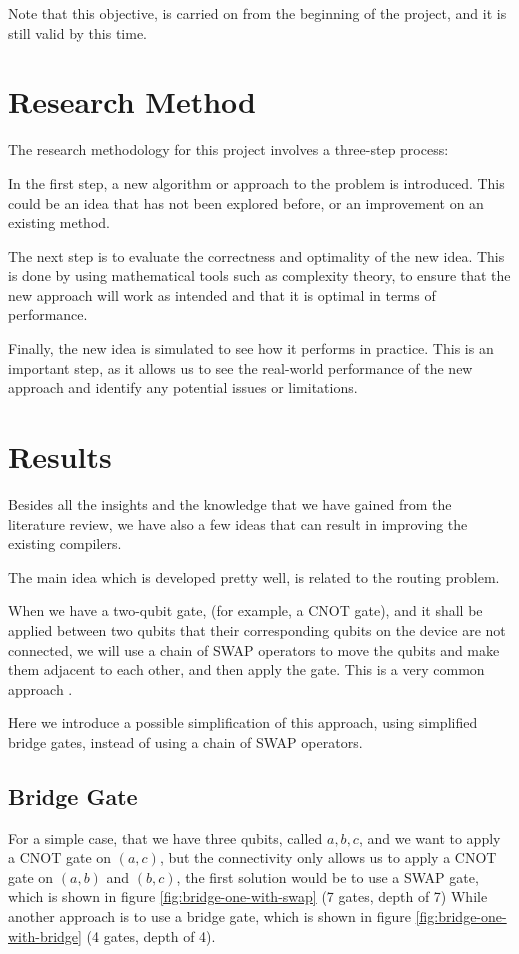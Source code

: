 \documentclass{article}
\begin{document}
Note that this objective, is carried on from the beginning of the project, and it is still valid by this time.

\section{Research Method}
The research methodology for this project involves a three-step process: 

In the first step, a new algorithm or approach to the problem is introduced. This could be an idea that has not been explored before, or an improvement on an existing method.

The next step is to evaluate the correctness and optimality of the new idea. This is done by using mathematical tools such as complexity theory, to ensure that the new approach will work as intended and that it is optimal in terms of performance.

Finally, the new idea is simulated to see how it performs in practice. This is an important step, as it allows us to see the real-world performance of the new approach and identify any potential issues or limitations.

\section{Results}

Besides all the insights and the knowledge that we have gained from the literature review, we have also a few ideas that can result in improving the existing compilers.

The main idea which is developed pretty well, is related to the routing problem.

When we have a two-qubit gate, (for example, a CNOT gate), and it shall be applied between two qubits that their corresponding qubits on the device are not connected, we will use a chain of SWAP operators to move the qubits and make them adjacent to each other, and then apply the gate. This is a very common approach \cite{cowtan2019}.

Here we introduce a possible simplification of this approach, using simplified bridge gates, instead of using a chain of SWAP operators.

\subsection{Bridge Gate}

For a simple case, that we have three qubits, called $a, b, c$, and we want to apply a CNOT gate on $(a, c)$, but the connectivity only allows us to apply a CNOT gate on $(a, b)$ and $(b, c)$, the first solution would be to use a SWAP gate, which is shown in figure \ref{fig:bridge-one-with-swap} (7 gates, depth of 7)
While another approach is to use a bridge gate, which is shown in figure \ref{fig:bridge-one-with-bridge} (4 gates, depth of 4). \cite{shende2006}
\end{document}
